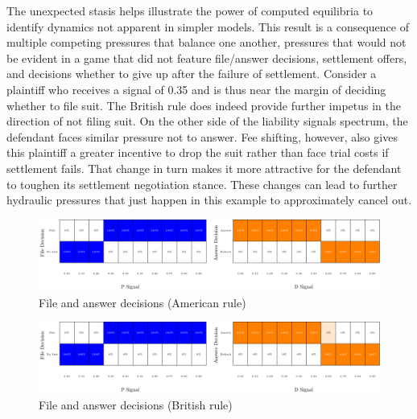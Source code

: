 \documentclass{article}
\begin{document}
The unexpected stasis helps illustrate the power of computed equilibria to identify dynamics not apparent in simpler models. This result is a consequence of multiple competing pressures that balance one another, pressures that would not be evident in a game that did not feature file/answer decisions, settlement offers, and decisions whether to give up after the failure of settlement. Consider a plaintiff who receives a signal of 0.35 and is thus near the margin of deciding whether to file suit. The British rule does indeed provide further impetus in the direction of not filing suit. On the other side of the liability signals spectrum, the defendant faces similar pressure not to answer. Fee shifting, however, also gives this plaintiff a greater incentive to drop the suit rather than face trial costs if settlement fails. That change in turn makes it more attractive for the defendant to toughen its settlement negotiation stance. These changes can lead to further hydraulic pressures that just happen in this example to approximately cancel out. 

\begin{figure}[h!]
\centering
\includegraphics[scale=0.50, trim={0in 0in 0in 0in}, clip]{../Figures/File and answer decisions (American).pdf}
\caption{File and answer decisions (American rule)}
\label{fig:fileans_american}
\end{figure}

\begin{figure}[h!]
\centering
\includegraphics[scale=0.50, trim={0in 0in 0in 0in}, clip]{../Figures/File and answer decisions (British).pdf}
\caption{File and answer decisions (British rule)}
\label{fig:fileans_british}
\end{figure}
\end{document}
